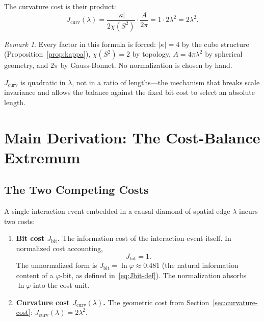 \documentclass[12pt]{article}
\theoremstyle{definition}
\theoremstyle{remark}
\newtheorem{remark}[theorem]{Remark}
\begin{document}
The curvature cost is their product:
\begin{equation}
  \boxed{
    J_{\mathrm{curv}}(\lambda)
    = \frac{|\kappa|}{2\chi(S^2)} \cdot \frac{A}{2\pi}
    = 1 \cdot 2\lambda^2
    = 2\lambda^2.
  }
  \label{eq:Jcurv}
\end{equation}

\begin{remark}
Every factor in this formula is forced: $|\kappa| = 4$ by the cube
structure (Proposition~\ref{prop:kappa}), $\chi(S^2) = 2$ by topology,
$A = 4\pi\lambda^2$ by spherical geometry, and $2\pi$ by Gauss-Bonnet.
No normalization is chosen by hand.

$J_{\mathrm{curv}}$ is quadratic in $\lambda$, not in a ratio of
lengths---the mechanism that breaks scale invariance and allows
the balance against the fixed bit cost to select an absolute length.
\end{remark}

\section{Main Derivation: The Cost-Balance Extremum}
\label{sec:main-derivation}

\subsection{The Two Competing Costs}

A single interaction event embedded in a causal diamond of spatial
edge $\lambda$ incurs two costs:

\begin{enumerate}
  \item \textbf{Bit cost $J_{\mathrm{bit}}$.} The information cost of
    the interaction event itself. In normalized cost accounting,
    \begin{equation}
      J_{\mathrm{bit}} = 1.
      \label{eq:Jbit-norm}
    \end{equation}
    The unnormalized form is $J_{\mathrm{bit}} = \ln\varphi \approx
    0.481$ (the natural information content of a $\varphi$-bit, as
    defined in~\eqref{eq:Jbit-def}). The normalization absorbs
    $\ln\varphi$ into the cost unit.

  \item \textbf{Curvature cost $J_{\mathrm{curv}}(\lambda)$.} The
    geometric cost from Section~\ref{sec:curvature-cost}:
    $J_{\mathrm{curv}}(\lambda) = 2\lambda^2$.
\end{enumerate}
\end{document}
